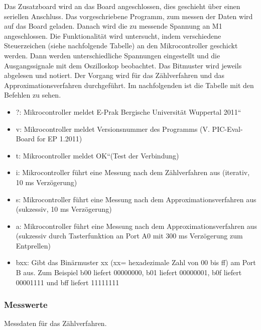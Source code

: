 \documentclass[12pt,a4paper]{article}
\begin{document}
Das Zusatzboard wird an das Board angeschlossen, dies geschieht über einen seriellen Anschluss. Das vorgeschriebene Programm, zum messen der Daten wird auf das Board geladen. Danach wird die zu messende Spannung an M1 angeschlossen. Die Funktionalität wird untersucht, indem verschiedene Steuerzeichen (siehe nachfolgende Tabelle) an den Mikrocontroller geschickt werden. Dann werden unterschiedliche Spannungen eingestellt und die Ausgangssignale mit dem Oszilloskop beobachtet. Das Bitmuster wird jeweils abgelesen und notiert. Der Vorgang wird für das Zählverfahren und das Approximationsverfahren durchgeführt. Im nachfolgenden ist die Tabelle mit den Befehlen zu sehen.

\begin{itemize}
\item	?: Mikrocontroller meldet E-Prak Bergische Universität Wuppertal 2011“

\item	v: Mikrocontroller meldet Versionsnummer des Programms (V. PIC-Eval-Board for EP 1.2011)

\item	t: Mikrocontroller meldet OK“(Test der Verbindung)

\item	i: Mikrocontroller führt eine Messung nach dem Zählverfahren aus (iterativ, 10 ms Verzögerung)

\item	s: Mikrocontroller führt eine Messung nach dem Approximationsverfahren aus (sukzessiv, 10 ms Verzögerung)

\item	a: Mikrocontroller führt eine Messung nach dem Approximationsverfahren aus (sukzessiv durch Tasterfunktion an Port A0 mit 300 ms Verzögerung zum Entprellen)

\item	bxx: Gibt das Binärmuster xx (xx= hexadezimale Zahl von 00 bis ff) am Port B aus. Zum Beispiel b00 liefert 00000000, b01 liefert 00000001, b0f liefert 00001111 und bff liefert 11111111

\end{itemize}

\subsubsection*{Messwerte}

Messdaten für das Zählverfahren.
\end{document}
